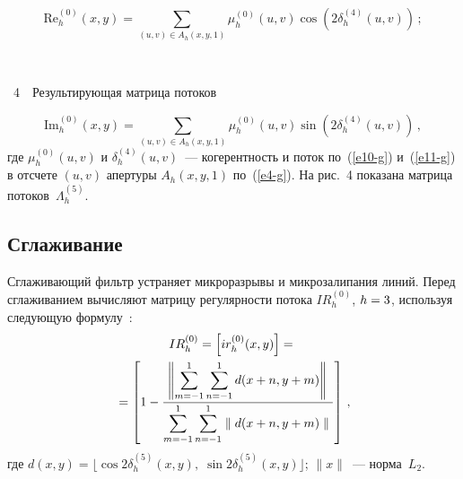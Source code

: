 \begin{multicols}{2}
\noindent
\begin{equation*}
\mathrm{Re}_h^{(0)}(x,y) = \!\!\!\!\sum\limits_{(u,v)\in A_h(x,y,1)}\!\!\!\!\mu_h^{(0)}(u,v)\cos\left( 
2\delta_h^{(4)}(u,v)\right)\,;
\end{equation*}


\begin{center} %
\vspace*{12pt}
\mbox{%
 \epsfxsize=79mm
}
\end{center}
\begin{center}
{{\figurename~4}\ \ \small{Результирующая матрица потоков}}
\end{center}
\vspace*{9pt}

\addtocounter{figure}{1}


\noindent
\begin{equation*}
\mathrm{Im}_h^{(0)}(x,y) = \!\!\!\!\sum\limits_{(u,v)\in A_h(x,y,1)}\!\!\!\! \mu_h^{(0)}(u,v)\sin\left( 
2\delta_h^{(4)}(u,v)\right)\,,
  \end{equation*}
где $\mu_h^{(0)}(u,v)$ и $\delta_h^{(4)}(u,v)$~--- когерентность и поток 
по~(\ref{e10-g}) и~(\ref{e11-g}) в отсчете $(u,v)$ апертуры $A_h(x,y,1)$ 
по~(\ref{e4-g}). На рис.~4 показана матрица потоков~$\Lambda_h^{(5)}$.



\subsection{Сглаживание} %

  Сглаживающий фильтр устраняет микроразрывы и микрозалипания линий. 
Перед сглаживанием вычисляют матрицу регулярности потока $IR_h^{(0)}$, 
$h\hm=3$, используя следующую формулу~\cite{1-g}:
  \begin{multline*}
  IR_h^{(0)} =\left[ ir_h^{(0)}(x,y)\right] ={}\\
  {}=\left[ 1-\displaystyle\frac{\displaystyle \left \Vert 
  \sum\limits_{m=-1}^1 \sum\limits_{n=-1}^1 d(x+n,y+m)\right\Vert\mathstrut}{\displaystyle \sum\limits_{m=-1}^1 
\sum\limits_{n=-1}^1 \parallel d(x+n,y+m)\parallel\mathstrut}\right]\,,
  \end{multline*}
где $d(x,y)=\lfloor \cos 2\delta_h^{(5)}(x,y),\;\sin2\delta_h^{(5)}(x,y)\rfloor$; 
$\parallel x\parallel$~--- норма~$L_2$.
  

\end{multicols}
